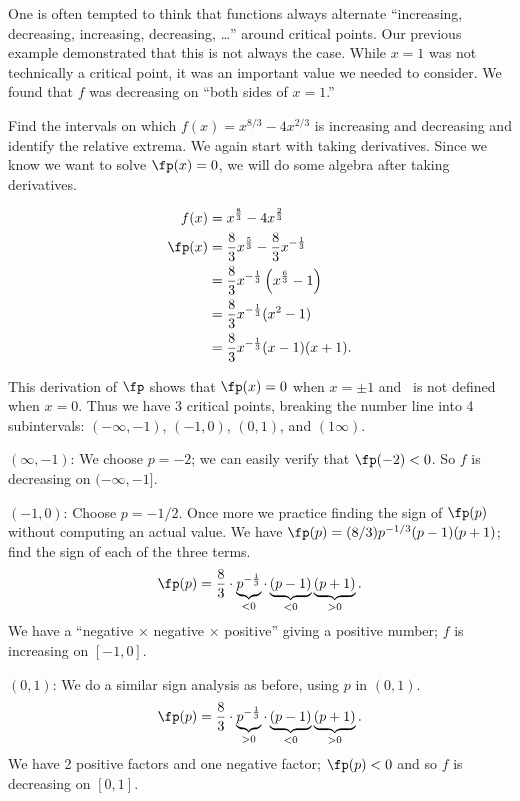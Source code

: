 One is often tempted to think that functions always alternate ``increasing, decreasing, increasing, decreasing, \dots'' around critical points. Our previous example demonstrated that this is not always the case. While $x=1$ was not technically a critical point, it was an important value we needed to consider. We found that $f$ was decreasing on ``both sides of $x=1$.''

\begin{example}\label{ex_incr3}
Find the intervals on which $f(x) = x^{8/3}-4x^{2/3}$ is increasing and decreasing and identify the relative extrema.
\solution
We again start with taking derivatives. Since we know we want to solve $\fp(x) = 0$, we will do some algebra after taking derivatives.

\begin{align*}
f(x) &= x^{\frac{8}{3}}-4x^{\frac{2}{3}} \\
\fp(x) &= \frac83 x^{\frac53} - \frac83x^{-\frac13}\\
	&= \frac83x^{-\frac13}\left(x^{\frac63}-1\right)\\
	&=\frac83x^{-\frac13}(x^2-1)\\
	&=\frac83x^{-\frac13}(x-1)(x+1).
\end{align*}

This derivation of $\fp$ shows that $\fp(x) = 0$ when $x=\pm 1$ and \fp\ is not defined when $x=0$. Thus we have 3 critical points, breaking the number line into 4 subintervals: $(-\infty,-1)$, $(-1,0)$, $(0,1)$, and $(1\infty)$.

\iflatexml\begin{description}\else\begin{description}[leftmargin=0pt]\fi
\item[Interval 1,] $(\infty,-1)$: We choose $p=-2$; we can easily verify that $\fp(-2)<0$. So $f$ is decreasing on $(-\infty,-1]$.

\item[Interval 2,] $(-1,0)$: Choose $p=-1/2$. Once more we practice finding the sign of $\fp(p)$ without computing an actual value. We have $\fp(p) = (8/3)p^{-1/3}(p-1)(p+1)$; find the sign of each of the three terms. 
	\[\fp(p) = \frac 83 \cdot \underbrace{p^{-\frac13}}_{<0}\cdot \underbrace{(p-1)}_{<0}\underbrace{(p+1)}_{>0}.\]
	We have a ``negative $\times$ negative $\times$ positive'' giving a positive number; $f$ is increasing on $[-1,0]$.

\item[Interval 3,] $(0,1)$: We do a similar sign analysis as before, using $p$ in $(0,1)$.
	\[\fp(p) = \frac 83 \cdot \underbrace{p^{-\frac13}}_{>0}\cdot \underbrace{(p-1)}_{<0}\underbrace{(p+1)}_{>0}.\]
	We have 2 positive factors and one negative factor; $\fp(p)<0$ and so $f$ is decreasing on $[0,1]$.


\end{description}
\end{description}
\end{example}

